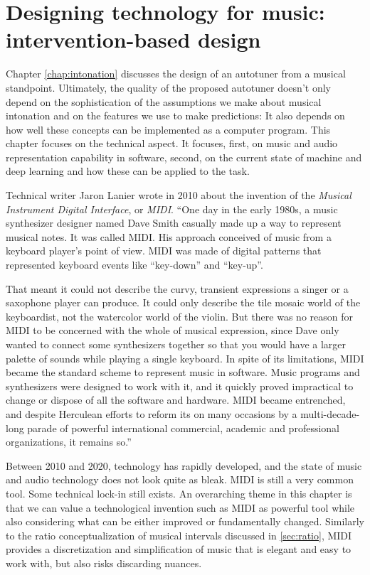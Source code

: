 \chapter{Designing technology for music: intervention-based design}
\label{chap:ibr}
Chapter \ref{chap:intonation} discusses the design of an autotuner from a musical standpoint. Ultimately, the quality of the proposed autotuner doesn't only depend on the sophistication of the assumptions we make about musical intonation and on the features we use to make predictions: It also depends on how well these concepts can be implemented as a computer program. This chapter focuses on the technical aspect. It focuses, first, on music and audio representation capability in software, second, on the current state of machine and deep learning and how these can be applied to the task.

Technical writer Jaron Lanier wrote in 2010 about the invention of the \textit{Musical Instrument Digital Interface}, or \textit{MIDI}. ``One day in the early 1980s, a music synthesizer designer named Dave Smith casually made up a way to represent musical notes. It was called MIDI. His approach conceived of music from a keyboard player's point of view. MIDI was made of digital patterns that represented keyboard events like ``key-down'' and ``key-up''. 

That meant it could not describe the curvy, transient expressions a singer or a saxophone player can produce. It could only describe the tile mosaic world of the keyboardist, not the watercolor world of the violin. But there was no reason for MIDI to be concerned with the whole of musical expression, since Dave only wanted to connect some synthesizers together so that you would have a larger palette of sounds while playing a single keyboard. In spite of its limitations, MIDI became the standard scheme to represent music in software. Music programs and synthesizers were designed to work with it, and it quickly proved impractical to change or dispose of all the software and hardware. MIDI became entrenched, and despite Herculean efforts to reform its on many occasions by a multi-decade-long parade of powerful international commercial, academic and professional organizations, it remains so.'' \cite{lanier2010you}

Between 2010 and 2020, technology has rapidly developed, and the state of music and audio technology does not look quite as bleak. MIDI is still a very common tool. Some technical lock-in still exists. An overarching theme in this chapter is that we can value a technological invention such as MIDI as powerful tool while also considering what can be either improved or fundamentally changed. Similarly to the ratio conceptualization of musical intervals discussed in \ref{sec:ratio}, MIDI provides a discretization and simplification of music that is elegant and easy to work with, but also risks discarding nuances. 

